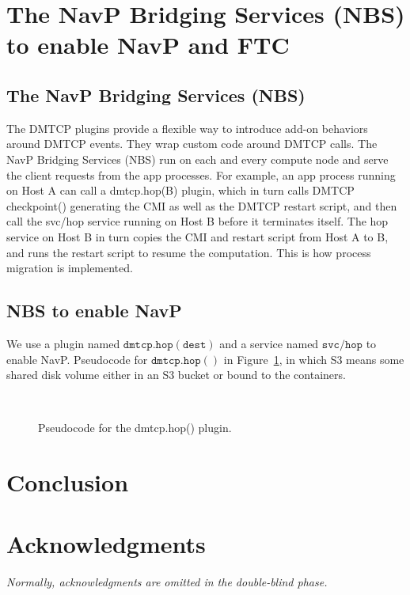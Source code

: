 \documentclass[conference]{IEEEtran}
\newcommand{\TODO}[1]{{\color{blue}\textit{#1}}}
\begin{document}
\section{The NavP Bridging Services (NBS) to enable NavP and FTC}
\label{sec:s2}

\subsection{The NavP Bridging Services (NBS)}
\label{subsec:s21}

The DMTCP plugins provide a flexible way to introduce add-on behaviors around DMTCP events. They wrap custom code around DMTCP calls. The NavP Bridging Services (NBS) run on each and every compute node and serve the client requests from the app processes. For example, an app process running on Host A can call a dmtcp.hop(B) plugin, which in turn calls DMTCP checkpoint() generating the CMI as well as the DMTCP restart script, and then call the svc/hop service running on Host B before it terminates itself. The hop service on Host B in turn copies the CMI and restart script from Host A to B, and runs the restart script to resume the computation. This is how process migration is implemented.

\subsection{NBS to enable NavP}
\label{subsec:s22}

We use a plugin named $\mathtt{dmtcp.hop(dest)}$ and a service named $\mathtt{svc/hop}$ to enable NavP. 
Pseudocode for $\mathtt{dmtcp.hop()}$ in Figure~\ref{code:dmtcp_hop}, in which S3 means some shared disk volume either 
in an S3 bucket or bound to the containers.

\begin{figure}[!ht]
\vspace{0.3in}
\begin{center}
\begin{center}
\mbox{}\\[0.3em]
\end{center}
\hspace{\fill}%
\caption{Pseudocode for the dmtcp.hop() plugin.}
\label{code:dmtcp_hop}
\end{center}
\end{figure}


\section{Conclusion}
\label{sec:conclusion}


\section*{Acknowledgments}
\TODO{Normally, acknowledgments are omitted in the double-blind phase.}



\end{document}
